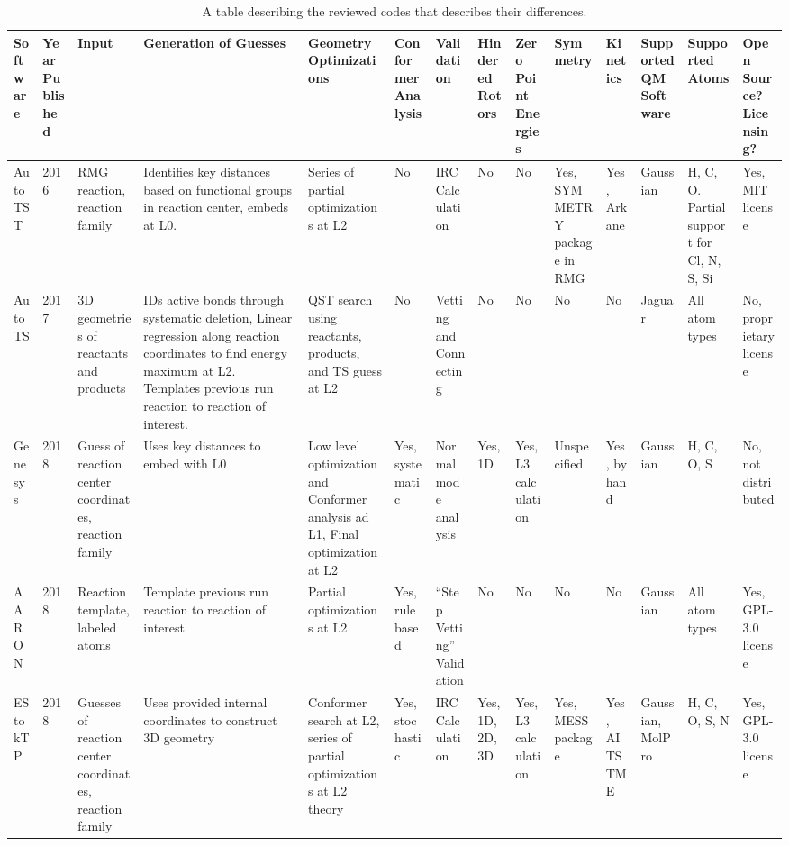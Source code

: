 \documentclass[preprint, 11pt]{elsarticle} %
\begin{document}
\begin{table}[h!]
\caption{A table describing the reviewed codes that describes their differences.}
\label{table:comparison}
\begin{center}
\begin{singlespace}
\begin{adjustbox}{angle=90}
\begin{scriptsize}
\begin{tabular}{m{0.45in}||m{0.25in} | m{0.45in} | m{0.8in} | m{0.7in}| m{0.5in}| m{0.5in }|m{0.45in}| m{0.45in}| m{0.5in}| m{0.45in}| m{0.5in}| m{0.5in} | m{0.45in}}
    
    Software & Year Published & Input & Generation of Guesses & Geometry Optimizations & Conformer Analysis & Validation & Hindered Rotors & Zero Point Energies & Symmetry & Kinetics & Supported QM Software & Supported Atoms & Open Source? Licensing? \\
    \hline
    \hline
    AutoTST & 2016 & RMG reaction, reaction family & Identifies key distances based on functional groups in reaction center, embeds at L0. & Series of partial optimizations at L2 & No & IRC Calculation & No & No & Yes, SYMMETRY package in RMG & Yes, Arkane & Gaussian & H, C, O. Partial support for Cl, N, S, Si & Yes, MIT license \\
    \hline
    AutoTS  & 2017 & 3D geometries of reactants and products & IDs active bonds through systematic deletion, Linear regression along reaction coordinates to find energy maximum at L2. Templates previous run reaction to reaction of interest. & QST search using reactants, products, and TS guess at L2 & No & Vetting and Connecting & No & No & No & No & Jaguar & All atom types & No, proprietary license \\
    \hline 
    Genesys & 2018 & Guess of reaction center coordinates, reaction family & Uses key distances to embed with L0 & Low level optimization and Conformer analysis ad L1, Final optimization at L2 & Yes, systematic & Normal mode analysis & Yes, 1D & Yes, L3 calculation & Unspecified & Yes, by hand & Gaussian& H, C, O, S & No, not distributed \\ 
    \hline
    AARON   & 2018 & Reaction template, labeled atoms & Template previous run reaction to reaction of interest & Partial optimizations at L2 & Yes, rule based & ``Step Vetting'' Validation & No & No & No & No & Gaussian & All atom types & Yes, GPL-3.0 license \\ 
    \hline
    EStokTP & 2018 & Guesses of reaction center coordinates, reaction family & Uses provided internal coordinates to construct 3D geometry & Conformer search at L2, series of partial optimizations at L2 theory & Yes, stochastic & IRC Calculation &Yes, 1D, 2D, 3D & Yes, L3 calculation & Yes, MESS package & Yes, AITSTME & Gaussian, MolPro & H, C, O, S, N & Yes, GPL-3.0 license  \\ 

\end{tabular}
\end{scriptsize}
\end{adjustbox}
\end{singlespace}
\end{center}
\end{table}
\end{document}
